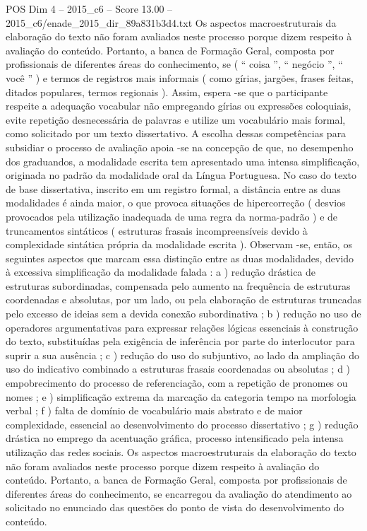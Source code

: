 \begin{textsample}{POS Dim 4 – 2015\_c6 – Score 13.00 – 2015\_c6/enade\_2015\_dir\_89a831b3d4.txt}
Os aspectos macroestruturais da elaboração do texto não foram avaliados neste processo porque dizem respeito à avaliação do conteúdo.
Portanto, a banca de Formação Geral, composta por profissionais de diferentes áreas do conhecimento, se ( “ coisa ”, “ negócio ”, “ você ” ) e termos de registros mais informais ( como gírias, jargões, frases feitas, ditados populares, termos regionais ).
Assim, espera -se que o participante respeite a adequação vocabular não empregando gírias ou expressões coloquiais, evite repetição desnecessária de palavras e utilize um vocabulário mais formal, como solicitado por um texto dissertativo.
A escolha dessas competências para subsidiar o processo de avaliação apoia -se na concepção de que, no desempenho dos graduandos, a modalidade escrita tem apresentado uma intensa simplificação, originada no padrão da modalidade oral da Língua Portuguesa.
No caso do texto de base dissertativa, inscrito em um registro formal, a distância entre as duas modalidades é ainda maior, o que provoca situações de hipercorreção ( desvios provocados pela utilização inadequada de uma regra da norma-padrão ) e de truncamentos sintáticos ( estruturas frasais incompreensíveis devido à complexidade sintática própria da modalidade escrita ).
Observam -se, então, os seguintes aspectos que marcam essa distinção entre as duas modalidades, devido à excessiva simplificação da modalidade falada : a ) redução drástica de estruturas subordinadas, compensada pelo aumento na frequência de estruturas coordenadas e absolutas, por um lado, ou pela elaboração de estruturas truncadas pelo excesso de ideias sem a devida conexão subordinativa ; b ) redução no uso de operadores argumentativas para expressar relações lógicas essenciais à construção do texto, substituídas pela exigência de inferência por parte do interlocutor para suprir a sua ausência ; c ) redução do uso do subjuntivo, ao lado da ampliação do uso do indicativo combinado a estruturas frasais coordenadas ou absolutas ; d ) empobrecimento do processo de referenciação, com a repetição de pronomes ou nomes ; e ) simplificação extrema da marcação da categoria tempo na morfologia verbal ; f ) falta de domínio de vocabulário mais abstrato e de maior complexidade, essencial ao desenvolvimento do processo dissertativo ; g ) redução drástica no emprego da acentuação gráfica, processo intensificado pela intensa utilização das redes sociais.
Os aspectos macroestruturais da elaboração do texto não foram avaliados neste processo porque dizem respeito à avaliação do conteúdo.
Portanto, a banca de Formação Geral, composta por profissionais de diferentes áreas do conhecimento, se encarregou da avaliação do atendimento ao solicitado no enunciado das questões do ponto de vista do desenvolvimento do conteúdo.

\end{textsample}
